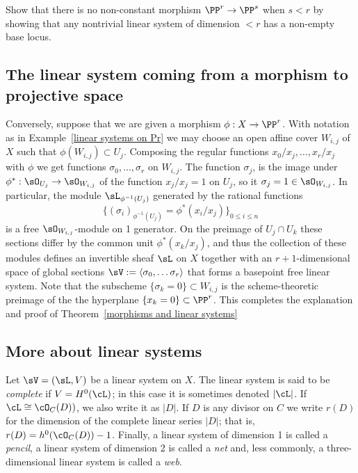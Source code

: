 \begin{exercise}\label{here there be basepoints}
 Show that there is no non-constant morphism $\PP^r\to \PP^s$ when $s<r$ by showing that any nontrivial linear
 system of dimension $<r$ has a non-empty base locus.
\end{exercise}

\subsection{The linear system coming from a morphism to projective space}

Conversely, suppose that we are given a morphism $\phi: X\to \PP^{r}$. With notation as in Example~\ref{linear systems on Pr} we may choose an open affine cover $W_{i,j}$ of $X$ such that $\phi(W_{i,j})\subset U_{j}$. Composing the regular
functions
$x_{0}/x_{j},\dots, x_{r}/x_{j}$ with $\phi$ we get functions $\sigma_{0},\dots,\sigma_{r}$ on $W_{i,j}$.  The function $\sigma_{j}$, is the image under $\phi^*: \sO_{U_j} \to \sO_{W_{i,j}}$ of the function $x_j/x_j = 1$ on $U_{j}$, so it $\sigma_j = 1\in \sO_{W_{i,j}}$. In particular, the module $\sL_{\phi^{-1}(U_j)}$ generated by the rational functions 
$$
\{(\sigma_i)_{\phi^{-1}(U_j)} = \phi^*(x_i/x_j)\}_{0\leq i\leq n}
$$
 is a free $\sO_{W_{i,j}}$-module on 1 generator. On the preimage of $U_j\cap U_k$ these sections differ by the common unit $\phi^*(x_k/x_j)$, and thus the collection of these modules defines an invertible sheaf $\sL$ on $X$ together with an
$r+1$-dimensional space of global sections $\sV := \langle \sigma_0,\dots \sigma_r\rangle$ that forms a basepoint free linear system. Note that the subscheme  $\{\sigma_k = 0\} \subset W_{i,j}$  is the scheme-theoretic preimage of the
the hyperplane $\{x_k = 0\}\subset \PP^r$. This completes the explanation and proof of Theorem~\ref{morphisms and linear systems}


\subsection{More about linear systems}


Let $\sV = (\sL, V)$ be a linear system on $X$.  The linear system is said to be \emph{complete} if $V = H^0(\cL)$; in this case it is sometimes denoted $|\cL|$. If $\cL \cong \cO_C(D))$, we also write it as $|D|$. 
 If $D$ is any divisor on $C$ we write $r(D)$ for the dimension of the complete linear series $|D|$; that is, $r(D) = h^0(\cO_C(D)) - 1$. Finally, a linear system of dimension 1 is called a \emph{pencil}, a linear system of dimension 2 is called a \emph{net} and, less commonly, a three-dimensional linear system is called a \emph{web}. 

